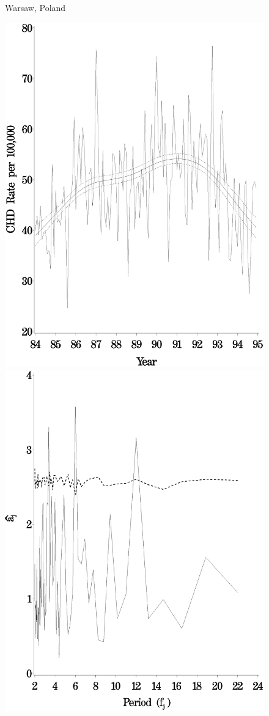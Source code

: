 \begin{figure}[!h]
\centerline{Warsaw, Poland}
    \centerline{
    \includegraphics[scale=0.2]{figures/trend_twostage_warsaw.eps}
    \includegraphics[scale=0.2]{figures/periodogram_twostage_warsaw.eps}
}
\end{figure}
